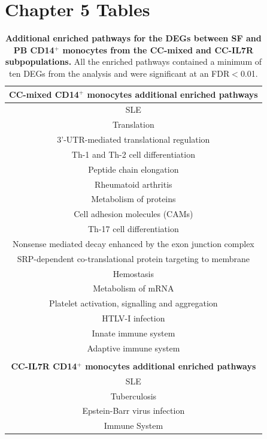 \clearpage

\section{Chapter 5 Tables}

\begin{table}[htbp]
\centering
\begin{tabular}{@{} c }
\toprule
\textbf{CC-mixed CD14$^+$ monocytes additional enriched pathways} \\
\midrule
\midrule
SLE \\
Translation \\
3'-UTR-mediated translational regulation \\
Th-1 and Th-2 cell differentiation \\
Peptide chain elongation \\
Rheumatoid arthritis \\
Metabolism of proteins \\
Cell adhesion molecules (CAMs) \\
Th-17 cell differentiation \\
Nonsense mediated decay enhanced by the exon junction complex \\
SRP-dependent co-translational protein targeting to membrane \\
Hemostasis \\
Metabolism of mRNA \\
Platelet activation, signalling and aggregation \\
HTLV-I infection \\
Innate immune system \\
Adaptive immune system \\
                        \\
\textbf{CC-IL7R CD14$^+$ monocytes additional enriched pathways} \\
\midrule
\midrule
SLE \\
Tuberculosis \\
Epstein-Barr virus infection \\
Immune System \\
\bottomrule
\end{tabular}
\medskip %
\caption[Additional enriched pathways for the DEGs between SF and PB CD14$^+$ monocytes from the CC-mixed and CC-IL7R subpopulations.]{\textbf{Additional enriched pathways for the DEGs between SF and PB CD14$^+$ monocytes from the CC-mixed and CC-IL7R subpopulations.} All the enriched pathways contained a minimum of ten DEGs from the analysis and were significant at an FDR$<$0.01.}
\label{tab:PSA_scRNAseq_CC_mixed_and_IL7R_additional_pathways}
\end{table}


